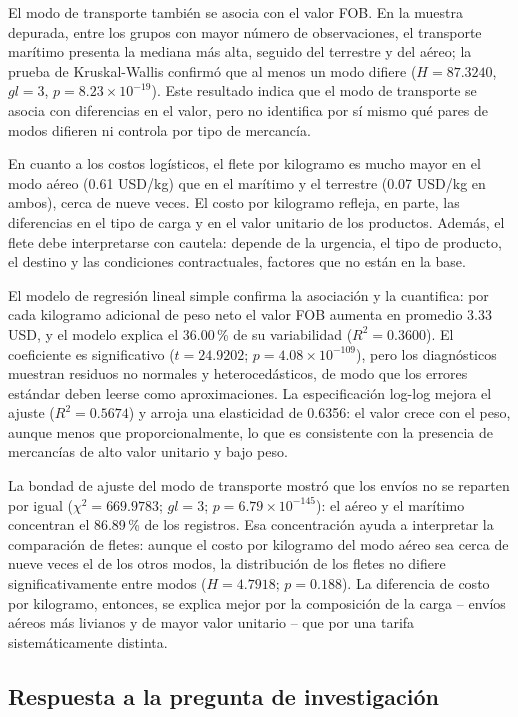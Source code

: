 \documentclass[12pt]{article}
\begin{document}
El modo de transporte también se asocia con el valor FOB. En la
muestra depurada, entre los grupos con mayor número de observaciones,
el transporte marítimo presenta la mediana más alta, seguido del
terrestre y del aéreo; la prueba de Kruskal-Wallis confirmó que al
menos un modo difiere (\(H = 87.3240\), \(gl = 3\),
\(p = 8.23 \times 10^{-19}\)).
Este resultado indica que el modo de transporte se asocia con
diferencias en el valor, pero no identifica por sí mismo qué pares de
modos difieren ni controla por tipo de mercancía.

En cuanto a los costos logísticos, el flete por kilogramo es mucho
mayor en el modo aéreo (0.61 USD/kg) que en el marítimo y el terrestre
(0.07 USD/kg en ambos), cerca de nueve veces. El costo por kilogramo
refleja, en parte, las diferencias en el tipo de carga y en el valor
unitario de los productos. Además, el flete debe interpretarse con
cautela: depende de la urgencia, el tipo de producto, el destino y las
condiciones contractuales, factores que no están en la base.

El modelo de regresión lineal simple confirma la asociación y la
cuantifica: por cada kilogramo adicional de peso neto el valor FOB
aumenta en promedio 3.33 USD, y el modelo explica el 36.00\,\% de su
variabilidad (\(R^2 = 0.3600\)). El coeficiente es significativo
(\(t = 24.9202\); \(p = 4.08 \times 10^{-109}\)), pero los diagnósticos
muestran residuos no normales y heterocedásticos, de modo que los
errores estándar deben leerse como aproximaciones. La especificación
log-log mejora el ajuste (\(R^2 = 0.5674\)) y arroja una elasticidad de
0.6356: el valor crece con el peso, aunque menos que proporcionalmente,
lo que es consistente con la presencia de mercancías de alto valor
unitario y bajo peso.

La bondad de ajuste del modo de transporte mostró que los envíos no se
reparten por igual (\(\chi^2 = 669.9783\); \(gl = 3\);
\(p = 6.79 \times 10^{-145}\)): el aéreo y el marítimo concentran el
86.89\,\% de los registros. Esa concentración ayuda a interpretar la
comparación de fletes: aunque el costo por kilogramo del modo aéreo sea
cerca de nueve veces el de los otros modos, la distribución de los
fletes no difiere significativamente entre modos
(\(H = 4.7918\); \(p = 0.188\)). La diferencia de costo por kilogramo,
entonces, se explica mejor por la composición de la carga -- envíos
aéreos más livianos y de mayor valor unitario -- que por una tarifa
sistemáticamente distinta.

\subsection{Respuesta a la pregunta de investigación}
\end{document}
